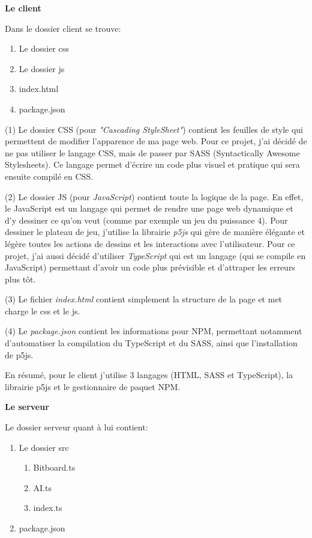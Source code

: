 \documentclass[a4paper]{article}
\newcommand{\ptitle}[1]{\vspace{10pt}
{\large \noindent \textbf{#1}}}
\begin{document}
    \ptitle{Le client}

	\noindent Dans le dossier client se trouve:
	\begin{enumerate}
		\item Le dossier css
		\item Le dossier js
		\item index.html
		\item package.json
	\end{enumerate}
    \vspace{5pt}

	(1) Le dossier CSS (pour \textit{"Cascading StyleSheet"}) contient les feuilles de style qui permettent de modifier l'apparence de ma page web. Pour ce projet, j'ai décidé de ne pas utiliser le langage CSS, mais de passer par SASS (Syntactically Awesome Stylesheets). Ce langage permet d'écrire un code plus visuel et pratique qui sera ensuite compilé en CSS.

	(2) Le dossier JS (pour \textit{JavaScript}) contient toute la logique de la page. En effet, le JavaScript est un langage qui permet de rendre une page web dynamique et d'y dessiner ce qu'on veut (comme par exemple un jeu du puissance 4). Pour dessiner le plateau de jeu, j'utilise la librairie \textit{p5js} qui gère de manière élégante et légère toutes les actions de dessins et les interactions avec l'utilisateur. Pour ce projet, j'ai aussi décidé d'utiliser \textit{TypeScript} qui est un langage (qui se compile en JavaScript) permettant d'avoir un code plus prévisible et d'attraper les erreurs plus tôt.

	(3) Le fichier \textit{index.html} contient simplement la structure de la page et met charge le css et le js.

	(4) Le \textit{package.json} contient les informations pour NPM, permettant notamment d'automatiser la compilation du TypeScript et du SASS, ainsi que l'installation de p5js.

	En résumé, pour le client j'utilise 3 langages (HTML, SASS et TypeScript), la librairie p5js et le gestionnaire de paquet NPM.

    \ptitle{Le serveur}

	\noindent Le dossier serveur quant à lui contient:
	\begin{enumerate}
		\item Le dossier src
		\begin{enumerate}
            \item Bitboard.ts
            \item AI.ts
            \item index.ts
        \end{enumerate}
		\item package.json
	\end{enumerate}
    \vspace{5pt}
\end{document}
